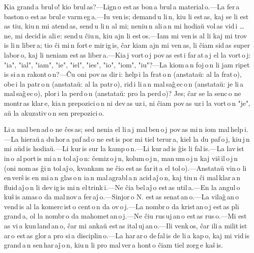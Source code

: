 \documentclass[ngerman,12pt,twoside]{book}
\begin{document}

Kia grand\,a brul\,o! kio brul\,as?---Lign\,o est\,as bon\,a brul\,a material\,o.---La fer\,a baston\,o est\,as brul\,e varm\,eg\,a.---Iu ven\,is; demand\,u li\,n, kiu li est\,as, kaj se li est\,as tiu, kiu\,n mi atend\,as, send\,u li\,n al mi; neniu\,n ali\,a\,n mi hodiaŭ vol\,as vid\,i \ldots{} ne, mi decid\,is ali\,e: send\,u ĉiu\,n, kiu ajn li est\,os.---Iam mi ven\,is al li kaj mi trov\,is li\,n liber\,a; tio ĉi mi\,n fort\,e mir\,ig\,is, ĉar kiam ajn mi ven\,as, li ĉiam sid\,as super labor\,o, kaj li neniam est\,as liber\,a.---Kia\,j vort\,o\,j pov\,as est\,i far\,at\,a\,j el la vort\,o\,j: "ia", "ial", "iam", "ie", "iel", "ies", "io", "iom", "iu"?---La kiom\,a\,n foj\,o\,n li jam ripet\,is si\,a\,n rakont\,o\,n?---Ĉu oni pov\,as dir\,i: help\,i la frat\,o\,n (anstataŭ: al la frat\,o), obe\,i la patr\,o\,n (anstataŭ: al la patr\,o), rid\,i li\,a\,n mal\,saĝ\,ec\,o\,n (anstataŭ: je li\,a mal\,saĝ\,ec\,o), plor\,i la perd\,o\,n (anstataŭ: pro la perd\,o)? Jes; ĉar se la senc\,o ne montr\,as klar\,e, kia\,n prepozici\,o\,n ni dev\,as uz\,i, ni ĉiam pov\,as uz\,i la vort\,o\,n "je", aŭ la akuzativ\,o\,n sen prepozici\,o. 



Li\,a mal\,ben\,ad\,o ne ĉes\,as; sed nenia el li\,a\,j mal\,ben\,o\,j pov\,as mi\,n iom mal\,help\,i.---La hieraŭ\,a du\,hor\,a paf\,ad\,o ne est\,is por mi tiel terur\,a, kiel la du paf\,o\,j, kiu\,j\,n mi aŭd\,is hodiaŭ.---Li kur\,is sur la kamp\,o\,n.---Li kur\,ad\,is ĝis li fal\,is.---La lav\,ist\,in\,o al\,port\,is mi\,a\,n tol\,aĵ\,o\,n: ĉemiz\,o\,j\,n, kolum\,o\,j\,n, man\,um\,o\,j\,n kaj viŝ\,il\,o\,j\,n (oni nom\,as ĝi\,n tol\,aĵ\,o, kvankam ne ĉio est\,as far\,it\,a el tol\,o).---Anstataŭ vin\,o li en\,verŝ\,is en mi\,a\,n glas\,o\,n ia\,n mal\,agrabl\,a\,n acid\,aĵ\,o\,n, kaj tiu\,n ĉi mal\,klar\,a\,n fluid\,aĵ\,o\,n li dev\,ig\,is mi\,n el\,trink\,i.---Ne ĉia bel\,aĵ\,o est\,as util\,a.---En la angul\,o kuŝ\,is amas\,o da mal\,nov\,a fer\,aĵ\,o.---Sinjor\,o N. est\,as senat\,an\,o.---La vilaĝ\,an\,o vend\,is al la komerc\,ist\,o cent\,o\,n da ov\,o\,j.---La nombr\,o da krist\,an\,o\,j est\,as pli grand\,a, ol la nombr\,o da mahomet\,an\,o\,j.---Ne ĉiu rus\,uj\,an\,o est\,as rus\,o.---Mi est\,as vi\,a kun\,land\,an\,o, ĉar mi ankaŭ est\,as ital\,uj\,an\,o.---Ili venk\,os, ĉar ili\,a milit\,ist\,ar\,o est\,as glor\,a pro si\,a disciplin\,o.---La har\,ar\,o de\,fal\,is de li\,a kap\,o, kaj mi vid\,is grand\,a\,n sen\,har\,aĵ\,o\,n, kiu\,n li pro mal\,ver\,a hont\,o ĉiam tiel zorg\,e kaŝ\,is. 
\end{document}
